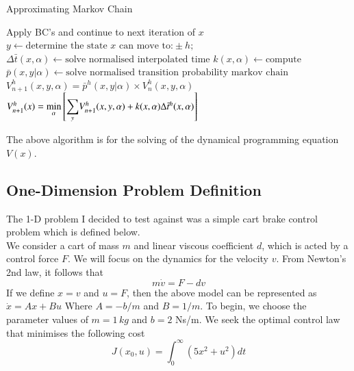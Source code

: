 \documentclass[11pt,draftd]{article}
\makeatletter
\DeclarePairedDelimiter\norm{\lVert}{\rVert}
\let\oldnorm\norm
\def\norm{\@ifstar{\oldnorm}{\oldnorm*}}
\makeatother
\begin{document}
\begin{algorithm}[H]
	\label{alg-mainloop}
	\caption{Approximating Markov Chain}
	\begin{algorithmic}[1]
		\Repeat
					\State Apply BC's and continue to next iteration of $ x $
				\EndIf
				\State $ y \gets \text{determine the state $x$ can move to:}\pm h; $
					\State $ \Delta\bar{t}(x,\alpha) \gets \text{solve normalised interpolated time} $
					\State $ k(x,\alpha) \gets \text{compute} $
						\State $ \bar{p}(x,y \vert \alpha) \gets \text{solve normalised transition probability markov chain}$
						\State $ V_{n+1}^{h}(x,y,\alpha) = \bar{p}^{h}(x,y \vert \alpha) \times V_{n}^{h}(x,y,\alpha) $
					\EndFor
				\EndFor
				\State $ V_{n+1}^{h} (x) = \min\limits_{\alpha}\left[ \mathlarger{\sum\limits_{y}} {V_{n+1}^{h}(x,y,\alpha)} + k(x,\alpha)\Delta\bar{t}^{h}(x,\alpha) \right]$
			\EndFor
		\Until{$ \norm{V^{h}_{n+1}}_{\infty} \le \varepsilon $}
	\end{algorithmic}
\end{algorithm}
\noindent The above algorithm is for the solving of the dynamical programming equation $ V(x) $. \\

\subsection{One-Dimension Problem Definition} \label{1dproblemdefinition}
\noindent The 1-D problem I decided to test against was a simple cart brake control problem which is defined below. \\

\noindent We consider a cart of mass $ m $ and linear viscous coefficient $ d $, which is acted by a control force $ F $. We will focus on the dynamics for the velocity $ v $. From Newton's 2nd law, it follows that
\begin{equation*}
	m\dot{v}=F-dv
\end{equation*}
If we define $ x = v $ and $ u = F $, then the above model can be represented as
$ \dot{x} = Ax + Bu$
Where $ A = -b/m $ and $ B = 1/m $. To begin, we choose the parameter values of $ m = 1\,kg$ and $ b = 2 $ Ns/m. We seek the optimal control law that minimises the following cost
\begin{equation*}
	J(x_0, u) = \int_{0}^{\infty}(5x^{2} + u^{2}) dt
\end{equation*}
\end{document}
